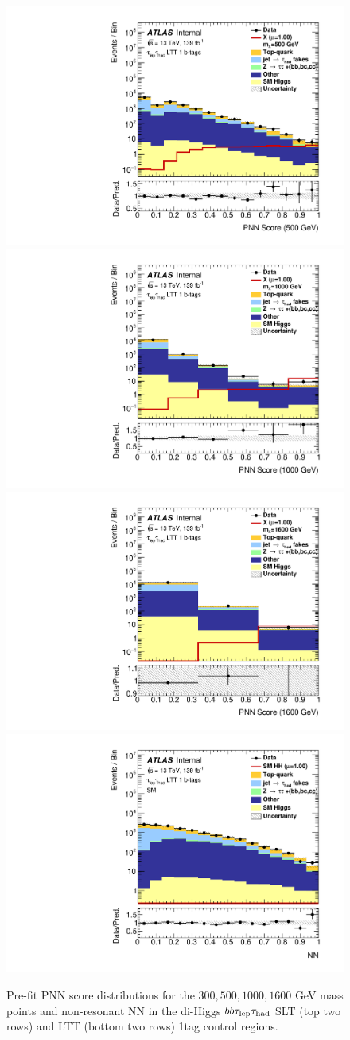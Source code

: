 \begin{figure}
    \includegraphics[width=.32\textwidth]{DiHiggs/plots/MVA/LTT/Region_BMin0_incJet1_dist500_J2_D2HDMPNN_T1_SpcTauLH_Y2015_LTT1_L1_Prefitlog.pdf}
    \includegraphics[width=.32\textwidth]{DiHiggs/plots/MVA/LTT/Region_BMin0_incJet1_dist1000_J2_D2HDMPNN_T1_SpcTauLH_Y2015_LTT1_L1_Prefitlog.pdf} \\
    \includegraphics[width=.32\textwidth]{DiHiggs/plots/MVA/LTT/Region_BMin0_incJet1_dist1600_J2_D2HDMPNN_T1_SpcTauLH_Y2015_LTT1_L1_Prefitlog.pdf}
    \includegraphics[width=.32\textwidth]{DiHiggs/plots/MVA/LTT/Region_BMin0_incJet1_distNN_J2_DSM_T1_SpcTauLH_Y2015_LTT1_L1_Prefitlog.pdf}
    \caption{Pre-fit PNN score distributions for the $300, 500, 1000, 1600$ 
    GeV mass points and non-resonant NN in the di-Higgs $bb\tau_{\mathrm{lep}}\tau_{\mathrm{had}}$ SLT (top two rows) and LTT (bottom two rows) 1tag control regions.}
    \label{fig:lephadmvaCRoutput}
    \end{figure}


